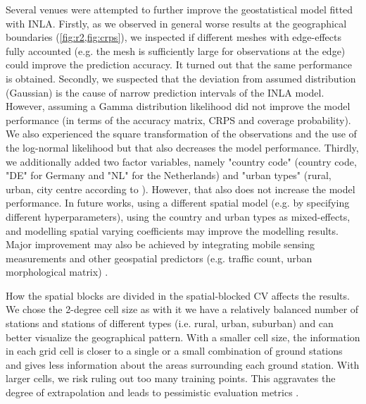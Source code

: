 \documentclass{article}
\begin{document}
Several venues were attempted to further improve the geostatistical model fitted with INLA. Firstly, as we observed in general worse results at the geographical boundaries (\cref{fig:r2,fig:crps}), we inspected if different meshes with edge-effects fully accounted (e.g. the mesh is sufficiently large for observations at the edge) could improve the prediction accuracy. It turned out that the same performance is obtained. Secondly, we suspected that the deviation from assumed distribution (Gaussian) is the cause of narrow prediction intervals of the INLA model. However, assuming a Gamma distribution likelihood did not improve the model performance (in terms of the accuracy matrix, CRPS and coverage probability). We also experienced the square transformation of the observations and the use of the log-normal likelihood but that also decreases the model performance. Thirdly, we additionally added two factor variables, namely "country code" (country code, "DE" for Germany and "NL" for the Netherlands) and "urban types" (rural, urban, city centre according to \citep{urbantype}). However, that also does not increase the model performance. In future works, using a different spatial model (e.g. by specifying different hyperparameters), using the country and urban types as mixed-effects, and modelling spatial varying coefficients may improve the modelling results. Major improvement may also be achieved by integrating mobile sensing measurements and other geospatial predictors (e.g. traffic count, urban morphological matrix) \citep{moragaetal17}.

 
How the spatial blocks are divided in the spatial-blocked CV affects the results. We chose the 2-degree cell size as with it we have a relatively balanced number of stations and stations of different types (i.e. rural, urban, suburban) and can better visualize the geographical pattern. With a smaller cell size, the information in each grid cell is closer to a single or a small combination of ground stations and gives less information about the areas surrounding each ground station. With larger cells, we risk ruling out too many training points. This aggravates the degree of extrapolation and leads to pessimistic evaluation metrics \citep{wadoux2021spatial}. %
\end{document}
